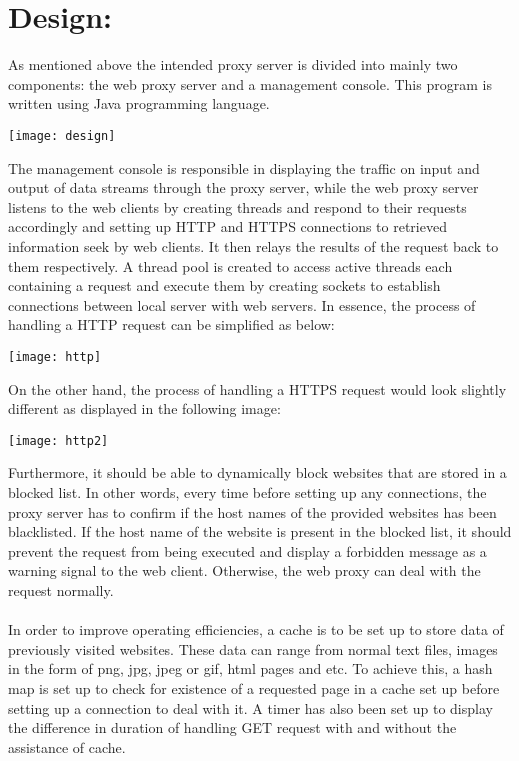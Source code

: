 \documentclass[12pt]{article}%
\begin{document}
\section*{Design:}
As mentioned above the intended proxy server is divided into mainly two components: the web proxy server and a management console. This program is written using Java programming language.\\
\begin{center}
\texttt{[image: design]}
\end{center}
The management console is responsible in displaying the traffic on input and output of data streams through the proxy server, while the web proxy server listens to the web clients by creating threads and respond to their requests accordingly and setting up HTTP and HTTPS connections to retrieved information seek by web clients. It then relays the results of the request back to them respectively. A thread pool is created to access active threads each containing a request and execute them by creating sockets to establish connections between local server with web servers. In essence, the process of handling a HTTP request can be simplified as below: \\
\begin{center}
\texttt{[image: http]}
\end{center}
\newpage
On the other hand, the process of handling a HTTPS request would look slightly different as displayed in the following image:  
\begin{center}
\texttt{[image: http2]}
\end{center}
Furthermore, it should be able to dynamically block websites that are stored in a blocked list. In other words, every time before setting up any connections, the proxy server has to confirm if the host names of the provided websites has been blacklisted. If the host name of the website is present in the blocked list, it should prevent the request from being executed and display a forbidden message as a warning signal to the web client. Otherwise, the web proxy can deal with the request normally. \\ \\
In order to improve operating efficiencies, a cache is to be set up to store data of previously visited websites. These data can range from normal text files, images in the form of png, jpg, jpeg or gif, html pages and etc. To achieve this, a hash map is set up to check for existence of a requested page in a cache set up before setting up a connection to deal with it. A timer has also been set up to display the difference in duration of handling GET request with and without the assistance of cache.  \\ \\
\end{document}
